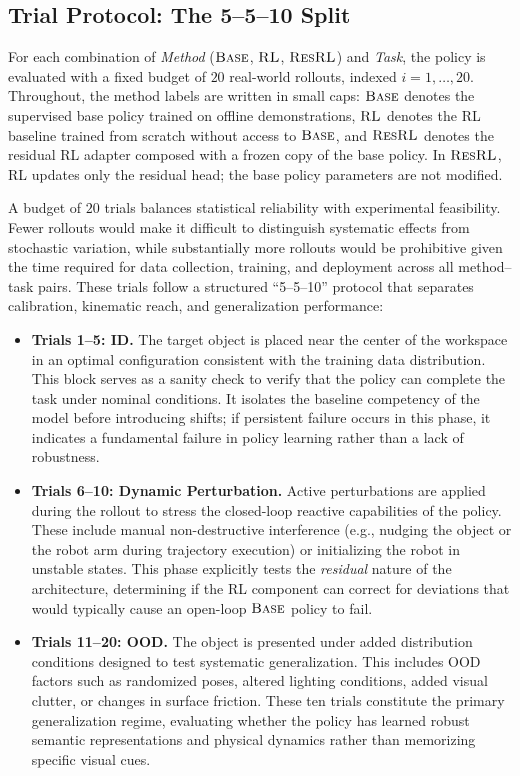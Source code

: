 \subsection{Trial Protocol: The 5--5--10 Split}
\label{sec:method:trial_protocol}

For each combination of \textit{Method} ($\text{\textsc{Base}}$, $\text{\textsc{RL}}$, $\text{\textsc{ResRL}}$) and \textit{Task}, the policy is evaluated with a fixed budget of $20$ real-world rollouts, indexed $i = 1,\dots,20$. Throughout, the method labels are written in small caps: $\text{\textsc{Base}}$ denotes the supervised base policy trained on offline demonstrations, $\text{\textsc{RL}}$ denotes the \ac{RL} baseline trained from scratch without access to $\text{\textsc{Base}}$, and $\text{\textsc{ResRL}}$ denotes the residual \ac{RL} adapter composed with a frozen copy of the base policy. In $\text{\textsc{ResRL}}$, \ac{RL} updates only the residual head; the base policy parameters are not modified.

A budget of $20$ trials balances statistical reliability with experimental feasibility. Fewer rollouts would make it difficult to distinguish systematic effects from stochastic variation, while substantially more rollouts would be prohibitive given the time required for data collection, training, and deployment across all method–task pairs. These trials follow a structured ``5--5--10'' protocol that separates calibration, kinematic reach, and generalization performance:

\begin{itemize}
    \item \textbf{Trials 1--5: \acf{ID}.}
    The target object is placed near the center of the workspace in an optimal configuration consistent with the training data distribution. This block serves as a sanity check to verify that the policy can complete the task under nominal conditions. It isolates the baseline competency of the model before introducing shifts; if persistent failure occurs in this phase, it indicates a fundamental failure in policy learning rather than a lack of robustness.
    
    \item \textbf{Trials 6--10: Dynamic Perturbation.}
    Active perturbations are applied during the rollout to stress the closed-loop reactive capabilities of the policy. These include manual non-destructive interference (e.g., nudging the object or the robot arm during trajectory execution) or initializing the robot in unstable states. This phase explicitly tests the \emph{residual} nature of the architecture, determining if the RL component can correct for deviations that would typically cause an open-loop $\text{\textsc{Base}}$ policy to fail.
    
    \item \textbf{Trials 11--20: \acf{OOD}.}
    The object is presented under added distribution conditions designed to test systematic generalization. This includes \ac{OOD} factors such as randomized poses, altered lighting conditions, added visual clutter, or changes in surface friction. These ten trials constitute the primary generalization regime, evaluating whether the policy has learned robust semantic representations and physical dynamics rather than memorizing specific visual cues.
\end{itemize}

